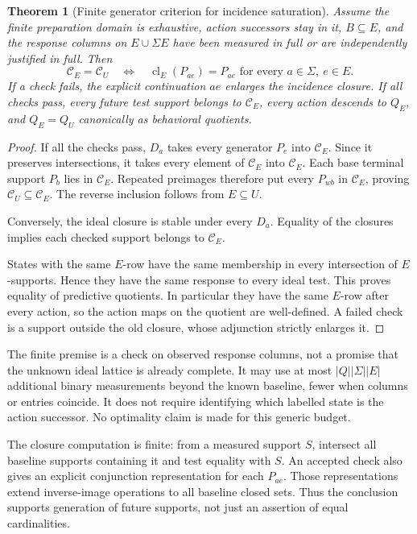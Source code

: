 \documentclass[11pt]{article}
\newtheorem{theorem}{Theorem}[section]
\theoremstyle{remark}
\newcommand{\cl}{\operatorname{cl}}
\newcommand{\C}{\mathcal C}
\begin{document}
\begin{theorem}[Finite generator criterion for incidence saturation]
\label{thm:saturation}
Assume the finite preparation domain is exhaustive, action successors stay in it, $B\subseteq E$, and the response columns on $E\cup\Sigma E$ have been measured in full or are independently justified in full. Then
\[
 \C_E=\C_U
 \quad\Longleftrightarrow\quad
 \cl_E(P_{ae})=P_{ae}
 \text{ for every }a\in\Sigma,\ e\in E.
\]
If a check fails, the explicit continuation $ae$ enlarges the incidence closure. If all checks pass, every future test support belongs to $\C_E$, every action descends to $Q_E$, and $Q_E=Q_U$ canonically as behavioral quotients.
\end{theorem}
\begin{proof}
If all the checks pass, $D_a$ takes every generator $P_e$ into $\C_E$. Since it preserves intersections, it takes every element of $\C_E$ into $\C_E$. Each base terminal support $P_b$ lies in $\C_E$. Repeated preimages therefore put every $P_{wb}$ in $\C_E$, proving $\C_U\subseteq\C_E$. The reverse inclusion follows from $E\subseteq U$.

Conversely, the ideal closure is stable under every $D_a$. Equality of the closures implies each checked support belongs to $\C_E$.

States with the same $E$-row have the same membership in every intersection of $E$-supports. Hence they have the same response to every ideal test. This proves equality of predictive quotients. In particular they have the same $E$-row after every action, so the action maps on the quotient are well-defined. A failed check is a support outside the old closure, whose adjunction strictly enlarges it.
\end{proof}

The finite premise is a check on observed response columns, not a promise that the unknown ideal lattice is already complete. It may use at most $|Q||\Sigma||E|$ additional binary measurements beyond the known baseline, fewer when columns or entries coincide. It does not require identifying which labelled state is the action successor. No optimality claim is made for this generic budget.

The closure computation is finite: from a measured support $S$, intersect all baseline supports containing it and test equality with $S$. An accepted check also gives an explicit conjunction representation for each $P_{ae}$. Those representations extend inverse-image operations to all baseline closed sets. Thus the conclusion supports generation of future supports, not just an assertion of equal cardinalities.
\end{document}
